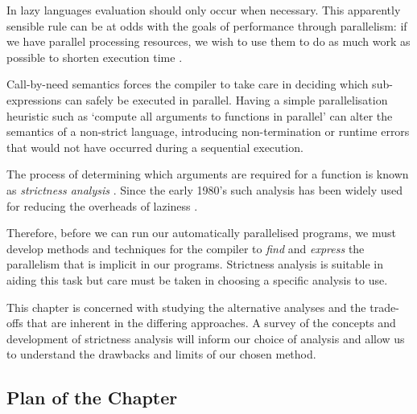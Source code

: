 In lazy languages evaluation should only occur when necessary. This apparently
sensible rule can be at odds with the goals of performance through parallelism:
if we have parallel processing resources, we wish to use them to do as much work
as possible to shorten execution time \citep{tremblay1995impact}.

Call-by-need semantics forces the compiler to take care in deciding which
sub-expressions can safely be executed in parallel.  Having a simple
parallelisation heuristic such as `compute all arguments to functions in
parallel' can alter the semantics of a non-strict language, introducing
non-termination or runtime errors that would not have occurred during a
sequential execution.

The process of determining which arguments are required for a function is known
as \emph{strictness analysis} \citep{mycroft1980theory}. Since the early 1980's
such analysis has been widely used for reducing the overheads of laziness
.

Therefore, before we can run our automatically parallelised programs, we must
develop methods and techniques for the compiler to \emph{find} and
\emph{express} the parallelism that is implicit in our programs. Strictness
analysis is suitable in aiding this task but care must be taken in choosing
a specific analysis to use.

This chapter is concerned with studying the alternative analyses and the
trade-offs that are inherent in the differing approaches. A survey of the
concepts and development of strictness analysis will inform our choice of
analysis and allow us to understand the drawbacks and limits of our chosen
method.

\subsection{Plan of the Chapter}



